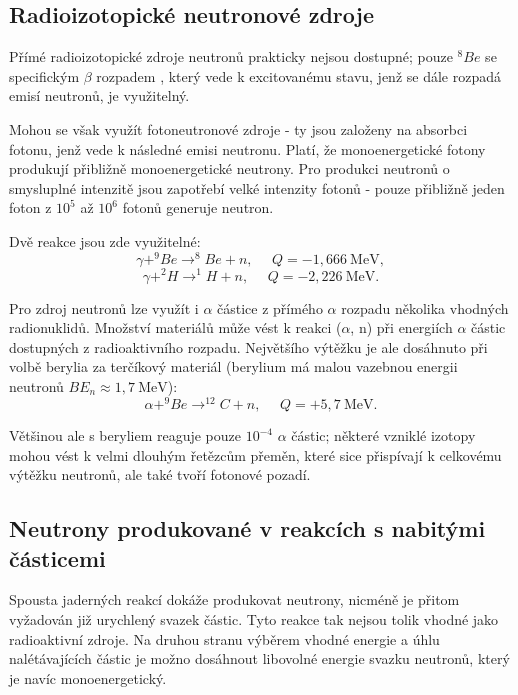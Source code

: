 \documentclass[../../main.tex]{subfiles}
\begin{document}
\subsection{Radioizotopické neutronové zdroje}

Přímé radioizotopické zdroje neutronů prakticky nejsou dostupné; pouze $^{8}Be$ se specifickým $\beta$ rozpadem , který vede k excitovanému stavu, jenž se dále rozpadá emisí neutronů, je využitelný.

Mohou se však využít fotoneutronové zdroje - ty jsou založeny na absorbci fotonu, jenž vede k následné emisi neutronu. Platí, že monoenergetické fotony produkují přibližně monoenergetické neutrony. Pro produkci neutronů o smysluplné intenzitě jsou zapotřebí velké intenzity fotonů - pouze přibližně jeden foton z $10^5$ až $10^6$ fotonů generuje neutron.

Dvě reakce jsou zde využitelné:
\begin{equation}
\gamma  + ^{9}Be \rightarrow ^{8}Be + n, ~~~~~~ Q = - 1,666 ~\mathrm{MeV},
\end{equation} 
\begin{equation}
\gamma + ^{2}H \rightarrow ^{1}H + n, ~~~~~~ Q = - 2,226 ~\mathrm{MeV}.
\end{equation}

Pro zdroj neutronů lze využít i $\alpha$ částice z přímého $\alpha$ rozpadu několika vhodných radionuklidů. Množství materiálů může vést k reakci ($\alpha$, n) při energiích $\alpha$ částic dostupných z radioaktivního rozpadu. Největšího výtěžku je ale dosáhnuto při volbě berylia za terčíkový materiál (berylium má malou vazebnou energii neutronů $B E_n \approx 1,7 ~\mathrm{MeV}$):
\begin{equation}
\alpha + ^{9}Be \rightarrow ^{12}C + n , ~~~~~~ Q = + 5,7 ~\mathrm{MeV}.
\end{equation}   

Většinou ale s beryliem reaguje pouze $10^{-4}$ $\alpha$ částic; některé vzniklé izotopy mohou vést k velmi dlouhým řetězcům přeměn, které sice přispívají k celkovému výtěžku neutronů, ale také tvoří fotonové pozadí.

\subsection{Neutrony produkované v reakcích s nabitými částicemi}

Spousta jaderných reakcí dokáže produkovat neutrony, nicméně je přitom vyžadován již urychlený svazek částic. Tyto reakce tak nejsou tolik vhodné jako radioaktivní zdroje. Na druhou stranu výběrem vhodné  energie a úhlu nalétávajících částic je možno dosáhnout libovolné energie svazku neutronů, který je navíc monoenergetický. 
\end{document}
